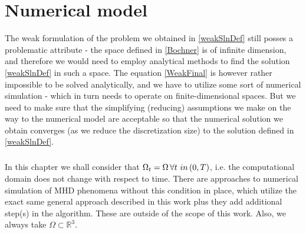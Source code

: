 \chapter{Numerical model}
The weak formulation of the problem we obtained in \ref{weakSlnDef} still posses a problematic attribute - the space defined in \ref{Bochner} is of infinite dimension, and therefore we would need to employ analytical methods to find the solution \ref{weakSlnDef} in such a space. The equation \ref{WeakFinal} is however rather impossible to be solved analytically, and we have to utilize some sort of numerical simulation - which in turn needs to operate on finite-dimensional spaces. But we need to make sure that the simplifying (reducing) assumptions we make on the way to the numerical model are acceptable so that the numerical solution we obtain converges (as we reduce the discretization size) to the solution defined in \ref{weakSlnDef}.

\paragraph{}
In this chapter we shall consider that $\Omega_t = \Omega\, \forall t \ in \left( 0, T\right) $, i.e. the computational domain does not change with respect to time. There are approaches to numerical simulation of MHD phenomena without this condition in place, which utilize the exact same general approach described in this work plus they add additional step(s) in the algorithm. These are outside of the scope of this work. Also, we always take $\Omega \subset \mathbb{R}^3$.









